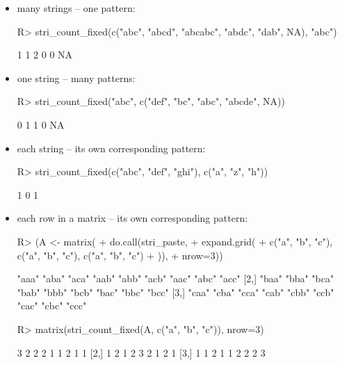 \documentclass[nojss]{jss}
\begin{document}
\begin{itemize}
\item many strings -- one pattern:

\begin{Schunk}
\begin{Sinput}
R> stri_count_fixed(c("abc", "abcd", "abcabc", "abdc", "dab", NA), "abc")
\end{Sinput}
\begin{Soutput}
[1]  1  1  2  0  0 NA
\end{Soutput}
\end{Schunk}

\item one string -- many patterns:

\begin{Schunk}
\begin{Sinput}
R> stri_count_fixed("abc", c("def", "bc", "abc", "abcde", NA))
\end{Sinput}
\begin{Soutput}
[1]  0  1  1  0 NA
\end{Soutput}
\end{Schunk}

\item each string -- its own corresponding pattern:

\begin{Schunk}
\begin{Sinput}
R> stri_count_fixed(c("abc", "def", "ghi"), c("a", "z", "h"))
\end{Sinput}
\begin{Soutput}
[1] 1 0 1
\end{Soutput}
\end{Schunk}

\item each row in a matrix -- its own corresponding pattern:

\begin{Schunk}
\begin{Sinput}
R> (A <- matrix(
+    do.call(stri_paste,
+      expand.grid(
+        c("a", "b", "c"), c("a", "b", "c"), c("a", "b", "c")
+      )),
+    nrow=3))
\end{Sinput}
\begin{Soutput}
     [,1]  [,2]  [,3]  [,4]  [,5]  [,6]  [,7]  [,8]  [,9]
[1,] "aaa" "aba" "aca" "aab" "abb" "acb" "aac" "abc" "acc"
[2,] "baa" "bba" "bca" "bab" "bbb" "bcb" "bac" "bbc" "bcc"
[3,] "caa" "cba" "cca" "cab" "cbb" "ccb" "cac" "cbc" "ccc"
\end{Soutput}
\begin{Sinput}
R> matrix(stri_count_fixed(A, c("a", "b", "c")), nrow=3)
\end{Sinput}
\begin{Soutput}
     [,1] [,2] [,3] [,4] [,5] [,6] [,7] [,8] [,9]
[1,]    3    2    2    2    1    1    2    1    1
[2,]    1    2    1    2    3    2    1    2    1
[3,]    1    1    2    1    1    2    2    2    3
\end{Soutput}
\end{Schunk}


\end{itemize}
\end{document}
